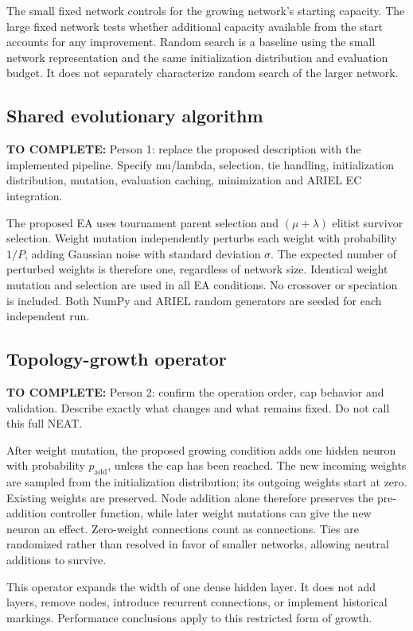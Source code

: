 \documentclass[sigconf,nonacm]{acmart}
\newcommand{\todo}[1]{\par\smallskip\noindent\textcolor{blue!60!black}{\textbf{TO COMPLETE:} #1}\par\smallskip}
\begin{document}
The small fixed network controls for the growing network's starting capacity.
The large fixed network tests whether additional capacity available from the
start accounts for any improvement. Random search is a baseline using the small
network representation and the same initialization distribution and evaluation
budget. It does not separately characterize random search of the larger network.

\subsection{Shared evolutionary algorithm}
\todo{Person 1: replace the proposed description with the implemented pipeline.
Specify mu/lambda, selection, tie handling, initialization distribution,
mutation, evaluation caching, minimization and ARIEL EC integration.}

The proposed EA uses tournament parent selection and $(\mu+\lambda)$ elitist
survivor selection. Weight mutation independently perturbs each weight with
probability $1/P$, adding Gaussian noise with standard deviation $\sigma$.
The expected number of perturbed weights is therefore one, regardless of network
size. Identical weight mutation and selection are used in all EA conditions.
No crossover or speciation is included. Both NumPy and ARIEL random generators
are seeded for each independent run.

\subsection{Topology-growth operator}
\todo{Person 2: confirm the operation order, cap behavior and validation. Describe
exactly what changes and what remains fixed. Do not call this full NEAT.}

After weight mutation, the proposed growing condition adds one hidden neuron
with probability $p_{\mathrm{add}}$, unless the cap has been reached. The new
incoming weights are sampled from the initialization distribution; its outgoing
weights start at zero. Existing weights are preserved. Node addition alone
therefore preserves the pre-addition controller function, while later weight
mutations can give the new neuron an effect. Zero-weight connections count as
connections. Ties are randomized rather than resolved in favor of smaller
networks, allowing neutral additions to survive.

This operator expands the width of one dense hidden layer. It does not add
layers, remove nodes, introduce recurrent connections, or implement historical
markings. Performance conclusions apply to this restricted form of growth.
\end{document}
